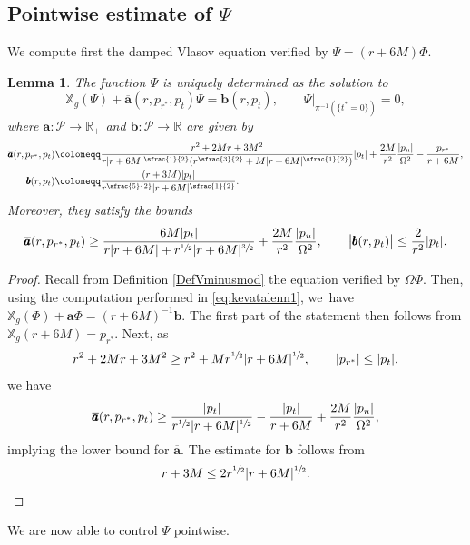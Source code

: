 \documentclass[JEP,XML,SOM,Unicode,published]{cedram}
\theoremstyle{plain}
\newtheorem{lemma}[proposition]{Lemma}
\theoremstyle{definition}
\newcommand\R{{\mathbb{R}}}
\newcommand\T{{\mathbb{X}}}
\begin{document}
\subsection{Pointwise estimate of $\Psi$}

We compute first the damped Vlasov equation verified by $\Psi =(r+6M)\Phi$.

\begin{lemma}\label{LembasicPsi}
The function $\Psi$ is uniquely determined as the solution to
\begin{equation*}
\T_g (\Psi)+ \overline{\pmb{a}} (r,p_{r^*},p_t) \Psi= \pmb{b}(r,p_t),\qquad \Psi\vert_{\pi^{-1}(\{t^*=0\})} =0,
\end{equation*}
where $\overline{\pmb{a}} \colon \mathcal{P} \to \R_+$ and $\pmb{b} \colon \mathcal{P} \to \R$ are given by
\begin{align*}
\overline{\pmb{a}}(r,p_{r^*},p_t) & \coloneqq \frac{r^2+2Mr+3M^2}{r|r+6M|^{\sfrac{1}{2}}(r^{\sfrac{3}{2}}+M|r+6M|^{\sfrac{1}{2}}) }|p_t| +\frac{2M}{r^2}\frac{|p_u|}{\Omega^2}-\frac{p_{r^*}}{r+6M}, \\
\pmb{b}(r,p_t) & \coloneqq \frac{(r+3M)|p_t|}{r^{\sfrac{5}{2}}|r+6M|^{\sfrac{1}{2}} }.
\end{align*}
Moreover, they satisfy the bounds
\[
\overline{\pmb{a}}(r,p_{r^*},p_t) \geq \frac{6M |p_t|}{r|r+6M|+r^{\sfrac{1}{2}} |r+6M|^{\sfrac{3}{2}} } + \frac{2M}{r^2}\frac{|p_u|}{\Omega^2}, \qquad \big|\pmb{b}(r,p_t) \big| \leq \frac{2}{r^2}|p_t|.
\]
\end{lemma}
\begin{proof}
Recall from Definition \ref{DefVminusmod} the equation verified by $\Omega\Phi$. Then, using the computation performed in \eqref{eq:kevatalenn1}, we~have $\T_g(\Phi)+\pmb{a} \Phi=(r+6M)^{-1} \pmb{b}$. The first part of the statement then follows from $\T_g(r+6M)=p_{r^*}$. Next, as
\[r^2+2Mr+3M^2 \geq r^{2}+Mr^{\sfrac{1}{2}}|r+6M|^{\sfrac{1}{2}}, \qquad |p_{r^*}| \leq |p_t|,
\]
we have
\[
\overline{\pmb{a}}(r,p_{r^*},p_t) \geq \frac{|p_t|}{r^{\sfrac{1}{2}} |r+6M|^{\sfrac{1}{2}} }-\frac{|p_t|}{r+6M} + \frac{2M}{r^2}\frac{|p_u|}{\Omega^2},
\]
implying the lower bound for $\overline{\pmb{a}}$. The estimate for $\pmb{b}$ follows from
\[r+3M \leq 2r^{\sfrac{1}{2}}|r+6M|^{\sfrac{1}{2}}.\qedhere
\]
\end{proof}

We are now able to control $\Psi$ pointwise.
\end{document}
